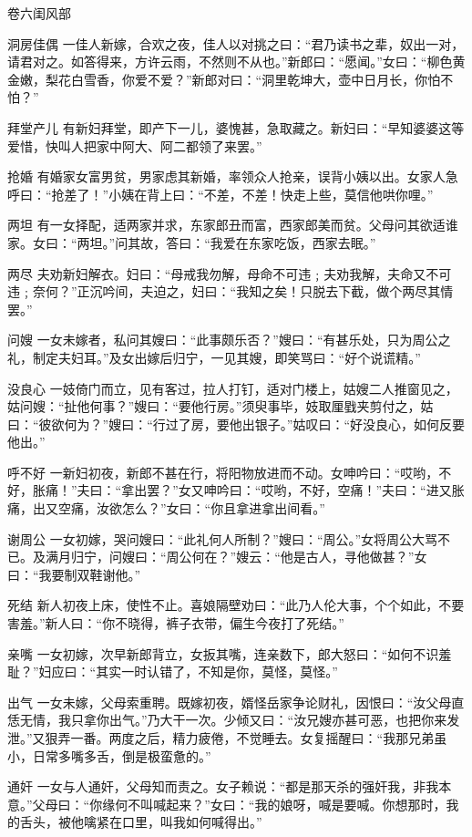 \documentclass[12pt,UTF8]{ctexbook}
\begin{document}
卷六闺风部

洞房佳偶
一佳人新嫁，合欢之夜，佳人以对挑之曰：“君乃读书之辈，奴出一对，请君对之。如答得来，方许云雨，不然则不从也。”新郎曰：“愿闻。”女曰：“柳色黄金嫩，梨花白雪香，你爱不爱？”新郎对曰：“洞里乾坤大，壶中日月长，你怕不怕？”

拜堂产儿
有新妇拜堂，即产下一儿，婆愧甚，急取藏之。新妇曰：“早知婆婆这等爱惜，快叫人把家中阿大、阿二都领了来罢。”

抢婚
有婚家女富男贫，男家虑其新婚，率领众人抢亲，误背小姨以出。女家人急呼曰：“抢差了！”小姨在背上曰：“不差，不差！快走上些，莫信他哄你哩。”

两坦
有一女择配，适两家并求，东家郎丑而富，西家郎美而贫。父母问其欲适谁家。女曰：“两坦。”问其故，答曰：“我爱在东家吃饭，西家去眠。”

两尽
夫劝新妇解衣。妇曰：“母戒我勿解，母命不可违﹔夫劝我解，夫命又不可违﹔奈何？”正沉吟间，夫迫之，妇曰：“我知之矣！只脱去下截，做个两尽其情罢。”

问嫂
一女未嫁者，私问其嫂曰：“此事颇乐否？”嫂曰：“有甚乐处，只为周公之礼，制定夫妇耳。”及女出嫁后归宁，一见其嫂，即笑骂曰：“好个说谎精。”

没良心
一妓倚门而立，见有客过，拉人打钉，适对门楼上，姑嫂二人推窗见之，姑问嫂：“扯他何事？”嫂曰：“要他行房。”须臾事毕，妓取厘戥夹剪付之，姑曰：“彼欲何为？”嫂曰：“行过了房，要他出银子。”姑叹曰：“好没良心，如何反要他出。”

呼不好
一新妇初夜，新郎不甚在行，将阳物放进而不动。女呻吟曰：“哎哟，不好，胀痛！”夫曰：“拿出罢？”女又呻吟曰：“哎哟，不好，空痛！”夫曰：“进又胀痛，出又空痛，汝欲怎么？”女曰：“你且拿进拿出间看。”

谢周公
一女初嫁，哭问嫂曰：“此礼何人所制？”嫂曰：“周公。”女将周公大骂不已。及满月归宁，问嫂曰：“周公何在？”嫂云：“他是古人，寻他做甚？”女曰：“我要制双鞋谢他。”

死结
新人初夜上床，使性不止。喜娘隔壁劝曰：“此乃人伦大事，个个如此，不要害羞。”新人曰：“你不晓得，裤子衣带，偏生今夜打了死结。”

亲嘴
一女初嫁，次早新郎背立，女扳其嘴，连亲数下，郎大怒曰：“如何不识羞耻？”妇应曰：“其实一时认错了，不知是你，莫怪，莫怪。”

出气
一女未嫁，父母索重聘。既嫁初夜，婿怪岳家争论财礼，因恨曰：“汝父母直恁无情，我只拿你出气。”乃大干一次。少倾又曰：“汝兄嫂亦甚可恶，也把你来发泄。”又狠弄一番。两度之后，精力疲倦，不觉睡去。女复摇醒曰：“我那兄弟虽小，日常多嘴多舌，倒是极蛮惫的。”

通奸
一女与人通奸，父母知而责之。女子赖说：“都是那天杀的强奸我，非我本意。”父母曰：“你缘何不叫喊起来？”女曰：“我的娘呀，喊是要喊。你想那时，我的舌头，被他噙紧在口里，叫我如何喊得出。”
\end{document}
